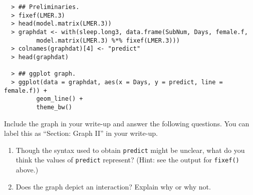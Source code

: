 \documentclass[]{article}
\begin{document}
\begin{verbatim}
  > ## Preliminaries.
  > fixef(LMER.3)
  > head(model.matrix(LMER.3))
  > graphdat <- with(sleep.long3, data.frame(SubNum, Days, female.f, 
         model.matrix(LMER.3) %*% fixef(LMER.3)))
  > colnames(graphdat)[4] <- "predict"
  > head(graphdat)

  > ## ggplot graph.
  > ggplot(data = graphdat, aes(x = Days, y = predict, line = female.f)) + 
         geom_line() + 
         theme_bw()
\end{verbatim}

\noindent Include the graph in your write-up and answer the following questions. You can label this as
``Section: Graph II'' in your write-up.

\begin{enumerate}[resume]
\item Though the syntax used to obtain \texttt{predict} might be unclear, what do you think the values of \texttt{predict} represent? (Hint: see the output for \texttt{fixef()} above.)
\item Does the graph depict an interaction? Explain why or why not.
\end{enumerate}
\end{document}
